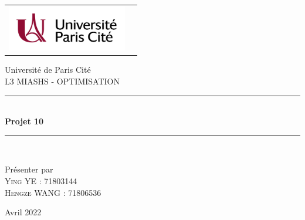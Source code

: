 \documentclass[12pt]{report}
\newcommand{\HRule}{\rule{\linewidth}{0.7mm}}
\begin{document}
	
	\begin{titlepage}
		\begin{center}
			\begin{tabular}{c@{\hskip 20cm}c}
				\includegraphics[height=2cm]{images/UniversiteParisCite_logo_horizontal_couleur_CMJN.jpg}
			\end{tabular}
		\end{center}
	
		
		\begin{center}

			Université de Paris Cité\\
			L3 MIASHS - OPTIMISATION
  
  			\vfill
  			
	 		\HRule \\[0.1cm]
	 		 { \Large \bfseries Projet 10	 }
	  		\HRule \\
		
		\end{center}
		
		\vfill
			
		\begin{center}
			Présenter par \\ \textsc{\Large Ying YE : 71803144 \\
			Hengze WANG : 71806536}\\[1cm] 
		
	
			
			\vspace{1cm}
	
			 Avril 2022
		\end{center}
		
		\vspace{1cm}
			
		
		

	\newpage
	\end{titlepage}



\pagestyle{plain}

\fancyhead{}





\setlength{\parskip}{.7em}

\titlespacing*{\section}{0pt}{.9em}{.8em}
\renewcommand{\baselinestretch}{1.1}
\end{document}
